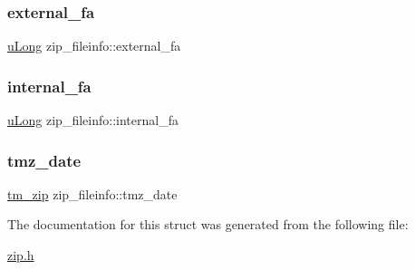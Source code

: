 \subsubsection{\texorpdfstring{external\+\_\+fa}{external\_fa}}
{\footnotesize\ttfamily \hyperlink{ioapi_8h_a50e9e9d5c30e481de822ad68fe537986}{u\+Long} zip\+\_\+fileinfo\+::external\+\_\+fa}

\mbox{\label{structzip__fileinfo_a396175a434b86115ce5600ab1dbb1644}} 
\subsubsection{\texorpdfstring{internal\+\_\+fa}{internal\_fa}}
{\footnotesize\ttfamily \hyperlink{ioapi_8h_a50e9e9d5c30e481de822ad68fe537986}{u\+Long} zip\+\_\+fileinfo\+::internal\+\_\+fa}

\mbox{\label{structzip__fileinfo_ae09a694a598b7507d23705764c9e46fb}} 
\subsubsection{\texorpdfstring{tmz\+\_\+date}{tmz\_date}}
{\footnotesize\ttfamily \hyperlink{zip_8h_a93b9012a85479327c6da966108d8f743}{tm\+\_\+zip} zip\+\_\+fileinfo\+::tmz\+\_\+date}



The documentation for this struct was generated from the following file\+:\begin{DoxyCompactItemize}
\item 
\hyperlink{zip_8h}{zip.\+h}\end{DoxyCompactItemize}
